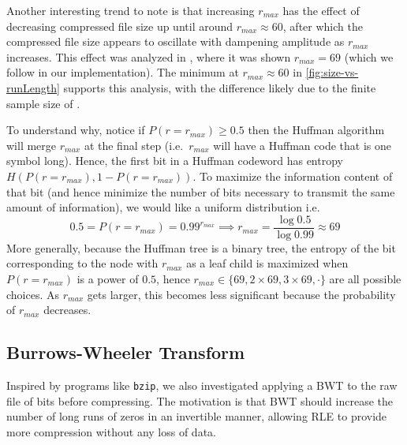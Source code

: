 \documentclass[a4paper,oneside,reqno]{hmcpset}
\begin{document}
\begin{solution}
  Another interesting trend to note is that increasing $r_{max}$ has the effect
  of decreasing compressed file size up until around $r_{max} \approx 60$,
  after which the compressed file size appears to oscillate with dampening
  amplitude as $r_{max}$ increases. This effect was analyzed in \cite{LoverH},
  where it was shown $r_{max}=69$ (which we follow in our implementation).
  The minimum at $r_{max} \approx 60$ in \autoref{fig:size-vs-runLength} supports
  this analysis, with the difference likely due to the finite sample size
  of .

  To understand why, notice if $P(r=r_{max}) \geq 0.5$ then the Huffman
  algorithm will merge $r_{max}$ at the final step (i.e.\ $r_{max}$ will have a
  Huffman code that is one symbol long). Hence, the first bit in a Huffman
  codeword has entropy $H(P(r=r_{max}), 1 - P(r=r_{max}))$. To maximize the
  information content of that bit (and hence minimize the number of bits
  necessary to transmit the same amount of information), we would like a
  uniform distribution i.e.
  \[
    0.5 = P(r=r_{max}) = 0.99^{r_{max}} \implies r_{max} = \frac{\log 0.5}{\log 0.99} \approx 69
  \]
  More generally, because the Huffman tree is a binary tree, the entropy of the
  bit corresponding to the node with $r_{max}$ as a leaf child is maximized
  when $P(r=r_{max})$ is a power of $0.5$, hence $r_{max} \in \{69, 2 \times
  69, 3 \times 69, \cdot\}$ are all possible choices. As $r_{max}$ gets larger,
  this becomes less significant because the probability of $r_{max}$ decreases.

  \subsection{Burrows-Wheeler Transform}

  Inspired by programs like \texttt{bzip}, we also investigated applying a BWT
  to the raw file of bits before compressing. The motivation is that BWT should
  increase the number of long runs of zeros in an invertible manner, allowing
  RLE to provide more compression without any loss of data.



\end{solution}


\nocite{*} %

\end{document}
